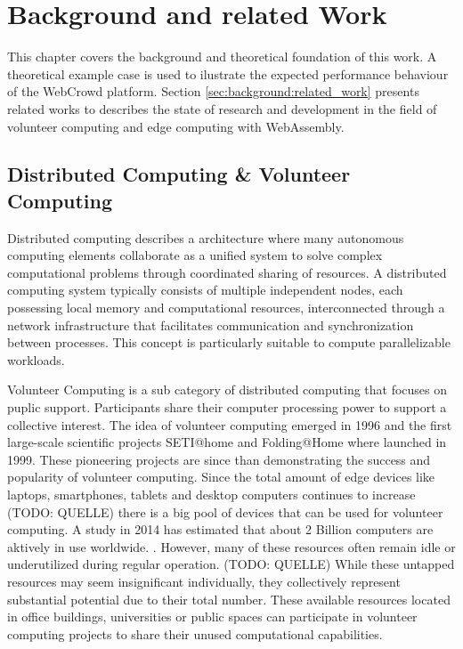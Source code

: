 \chapter{Background and related Work}
\label{ch:background}
This chapter covers the background and theoretical foundation of this work. A theoretical example case is used to ilustrate the expected performance behaviour of the WebCrowd platform. Section \ref{sec:background:related_work} presents related works to describes the state of research and development in the field of volunteer computing and edge computing with WebAssembly.

\section{Distributed Computing \& Volunteer Computing}
Distributed computing describes a architecture where many autonomous computing elements collaborate as a unified system to solve complex computational problems through coordinated sharing of resources. A distributed computing system typically consists of multiple independent nodes, each possessing local memory and computational resources, interconnected through a network infrastructure that facilitates communication and synchronization between processes. This concept is particularly suitable to compute parallelizable workloads.

Volunteer Computing is a sub category of distributed computing that focuses on puplic support. Participants share their computer processing power to support a collective interest. The idea of volunteer computing emerged in 1996 \cite{relatedwork:boinc1} and the first large-scale scientific projects SETI@home and Folding@Home where launched in 1999. \cite{relatedwork:boinc1,relatedwork:seti} These pioneering projects are since than demonstrating the success and popularity of volunteer computing. Since the total amount of edge devices like laptops, smartphones, tablets and desktop computers continues to increase (TODO: QUELLE) there is a big pool of devices that can be used for volunteer computing. A study in 2014 has estimated that about 2 Billion computers are aktively in use worldwide. \cite{intro:computersAmount,relatedwork:boinc1}. However, many of these resources often remain idle or underutilized during regular operation. (TODO: QUELLE) While these untapped resources may seem insignificant individually, they collectively represent substantial potential due to their total number. These available resources located in office buildings, universities or public spaces can participate in volunteer computing projects to share their unused computational capabilities.

